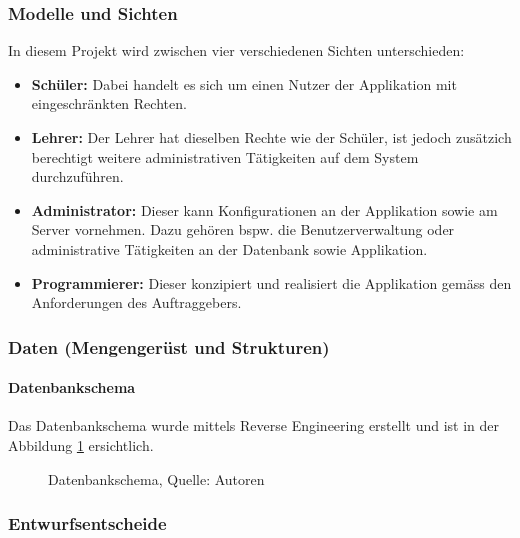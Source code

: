 \subsubsection{Modelle und Sichten}
In diesem Projekt wird zwischen vier verschiedenen Sichten unterschieden:
\begin{itemize}
    \item \textbf{Schüler:} Dabei handelt es sich um einen Nutzer der Applikation mit eingeschränkten Rechten.
    \item \textbf{Lehrer:} Der Lehrer hat dieselben Rechte wie der Schüler, ist jedoch zusätzich berechtigt weitere administrativen Tätigkeiten auf dem System durchzuführen.
    \item \textbf{Administrator: } Dieser kann Konfigurationen an der Applikation sowie am Server vornehmen. Dazu gehören bspw. die Benutzerverwaltung oder administrative Tätigkeiten an der Datenbank sowie Applikation.
    \item \textbf{Programmierer: } Dieser konzipiert und realisiert die Applikation gemäss den Anforderungen des Auftraggebers.
\end{itemize}
\subsubsection{Daten (Mengengerüst und Strukturen)}
\paragraph{Datenbankschema}
Das Datenbankschema wurde mittels Reverse Engineering erstellt und ist in der Abbildung \ref{img: datebankschema} ersichtlich.
\begin{figure}[H]
    \centering
    \caption[Datenbankschema]{Datenbankschema, Quelle: Autoren}
    \label{img: datebankschema}
\end{figure}
\subsubsection{Entwurfsentscheide}
